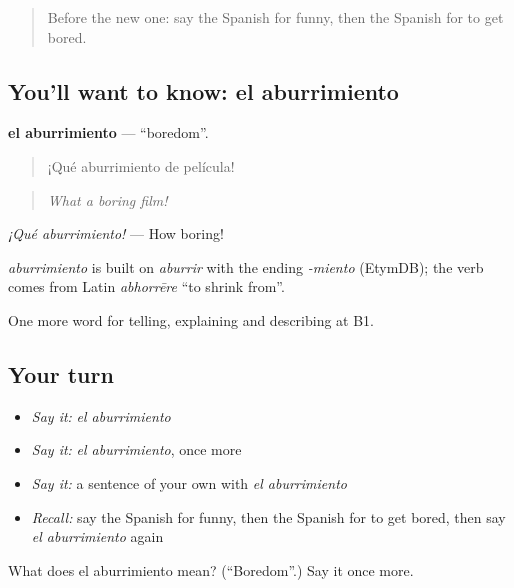 \label{lesson:ES-C713-aburrimiento}



\begin{quote}
Before the new one: say the Spanish for funny, then the Spanish for to get bored.
\end{quote}

\subsection*{You'll want to know: el aburrimiento}
\textbf{el aburrimiento} — \textquotedblleft{}boredom\textquotedblright{}.

\begin{quote}
¡Qué aburrimiento de película!
\end{quote}

\begin{quote}
\emph{What a boring film!}
\end{quote}

\emph{¡Qué aburrimiento!} — How boring!

\begin{cousinweb}
\emph{aburrimiento} is built on \emph{aburrir} with the ending \emph{-miento} (EtymDB); the verb comes from Latin \emph{abhorrēre} \textquotedblleft{}to shrink from\textquotedblright{}.
\end{cousinweb}

\begin{grammarlens}[title={What you've built}]
One more word for telling, explaining and describing at B1.
\end{grammarlens}

\subsection*{Your turn}
\begin{itemize}
\raggedright
  \item \emph{Say it:} \emph{el aburrimiento}
  \item \emph{Say it:} \emph{el aburrimiento}, once more
  \item \emph{Say it:} a sentence of your own with \emph{el aburrimiento}
  \item \emph{Recall:} say the Spanish for funny, then the Spanish for to get bored, then say \emph{el aburrimiento} again
\end{itemize}

\begin{tcolorbox}[breakable,colback=teal!4,colframe=teal!35!black,title={Before you move on}]
What does el aburrimiento mean? (\textquotedblleft{}Boredom\textquotedblright{}.) Say it once more.
\end{tcolorbox}
